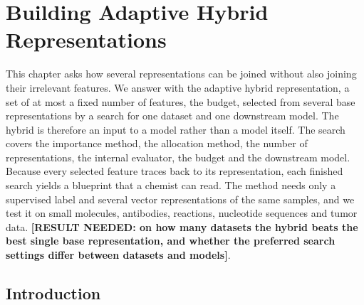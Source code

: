 \chapter{Building Adaptive Hybrid Representations}\label{chap:method}

This chapter asks how several representations can be joined without also joining their irrelevant features. We answer with the adaptive hybrid representation, a set of at most a fixed number of features, the budget, selected from several base representations by a search for one dataset and one downstream model. The hybrid is therefore an input to a model rather than a model itself. The search covers the importance method, the allocation method, the number of representations, the internal evaluator, the budget and the downstream model. Because every selected feature traces back to its representation, each finished search yields a blueprint that a chemist can read. The method needs only a supervised label and several vector representations of the same samples, and we test it on small molecules, antibodies, reactions, nucleotide sequences and tumor data. \textbf{[RESULT NEEDED: on how many datasets the hybrid beats the best single base representation, and whether the preferred search settings differ between datasets and models]}.


\section{Introduction}

